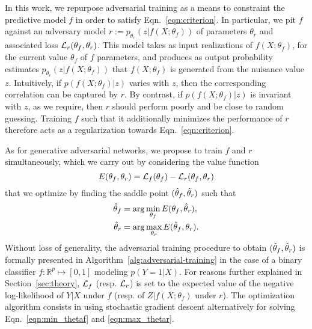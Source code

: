 \documentclass{article}
\theoremstyle{plain}
\begin{document}
In this work, we repurpose adversarial training as a means to constraint the
predictive model $f$ in order to satisfy Eqn.~\ref{eqn:criterion}. In
particular, we pit $f$ against an adversary model $r := p_{\theta_r}(z |
f(X;\theta_f))$ of parameters $\theta_r$ and associated loss ${\cal
L}_r(\theta_f, \theta_r)$. This model takes  as input realizations of $f(X;
\theta_f)$, for the current value $\theta_f$ of $f$ parameters, and produces as
output probability estimates $p_{\theta_r}(z | f(X;\theta_f))$ that $f(X;
\theta_f)$ is generated from the nuisance value $z$. Intuitively, if $p(f(X; \theta_f)|z)$
varies with $z$, then the corresponding correlation can be captured by $r$. By
contrast, if $p(f(X; \theta_f)|z)$ is invariant with $z$, as we require, then
$r$ should perform poorly and be close to random guessing. Training $f$ such
that it additionally minimizes the performance of $r$ therefore acts as a
regularization towards Eqn.~\ref{eqn:criterion}.

As for generative adversarial networks, we propose to
train $f$ and $r$ simultaneously, which we carry out by considering
the value function
\begin{equation}
    E(\theta_f, \theta_r) = {\cal L}_f(\theta_f) - {\cal L}_r(\theta_f, \theta_r)
\end{equation}
that we optimize by finding the saddle point $(\smash{\hat\theta_f}, \smash{\hat\theta_r})$ such that
\begin{align}
    \smash{\hat\theta_f} &= \arg \min_{\theta_f} E(\theta_f, \smash{\hat\theta_r}), \label{eqn:min_thetaf} \\
    \smash{\hat\theta_r} &= \arg \max_{\theta_r} E(\smash{\hat\theta_f}, \theta_r) \label{eqn:max_thetar}.
\end{align}
Without loss of generality, the adversarial training procedure to obtain
$(\smash{\hat\theta_f}, \smash{\hat\theta_r})$ is formally presented in
Algorithm~\ref{alg:adversarial-training} in the case of a binary classifier $f :
\mathbb{R}^p \mapsto [0,1]$ modeling $p(Y=1|X)$. For reasons further explained
in Section~\ref{sec:theory}, ${\cal L}_f$ (resp. ${\cal L}_r$) is set to the
expected value of the
negative log-likelihood of $Y|X$ under $f$ (resp. of $Z|f(X;\theta_f)$ under
$r$). The optimization algorithm consists in using stochastic gradient descent
alternatively for solving Eqn.~\ref{eqn:min_thetaf} and \ref{eqn:max_thetar}.
\end{document}
